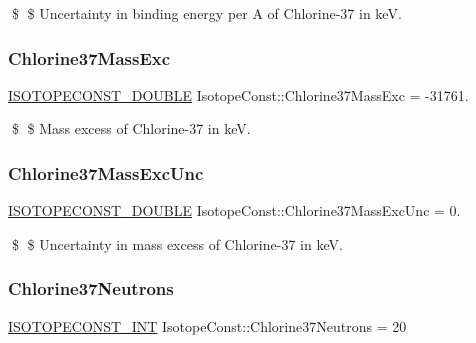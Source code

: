 \$ \$ Uncertainty in binding energy per A of Chlorine-\/37 in keV. \mbox{\label{group___isotope_const-_chlorine-_cl37_ga70407e79c3c8c1b8343953fd98a1e155}} 
\subsubsection{\texorpdfstring{Chlorine37\+Mass\+Exc}{Chlorine37MassExc}}
{\footnotesize\ttfamily \mbox{\hyperlink{group___isotope_const-_macros_ga8f45a7272ce02c0b4c65c44636ed719a}{I\+S\+O\+T\+O\+P\+E\+C\+O\+N\+S\+T\+\_\+\+D\+O\+U\+B\+LE}} Isotope\+Const\+::\+Chlorine37\+Mass\+Exc = -\/31761.}

\$ \$ Mass excess of Chlorine-\/37 in keV. \mbox{\label{group___isotope_const-_chlorine-_cl37_ga59a18a143782466d2af6e4449a3cc909}} 
\subsubsection{\texorpdfstring{Chlorine37\+Mass\+Exc\+Unc}{Chlorine37MassExcUnc}}
{\footnotesize\ttfamily \mbox{\hyperlink{group___isotope_const-_macros_ga8f45a7272ce02c0b4c65c44636ed719a}{I\+S\+O\+T\+O\+P\+E\+C\+O\+N\+S\+T\+\_\+\+D\+O\+U\+B\+LE}} Isotope\+Const\+::\+Chlorine37\+Mass\+Exc\+Unc = 0.}

\$ \$ Uncertainty in mass excess of Chlorine-\/37 in keV. \mbox{\label{group___isotope_const-_chlorine-_cl37_gae0b2c98606416c294ca4c95a306b9f60}} 
\subsubsection{\texorpdfstring{Chlorine37\+Neutrons}{Chlorine37Neutrons}}
{\footnotesize\ttfamily \mbox{\hyperlink{group___isotope_const-_macros_ga5f18360b3e99483a35c32d789e62621c}{I\+S\+O\+T\+O\+P\+E\+C\+O\+N\+S\+T\+\_\+\+I\+NT}} Isotope\+Const\+::\+Chlorine37\+Neutrons = 20}

